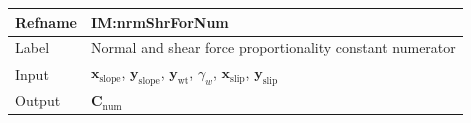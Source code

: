 \documentclass[12pt]{article}
\begin{document}
\medskip
\noindent
\begin{minipage}{\textwidth}
\begin{tabular}{>{\raggedright}p{}>{\raggedright\arraybackslash}p{}}
\toprule \textbf{Refname} & \textbf{IM:nrmShrForNum}
\label{IM:nrmShrForNum}
\\ \midrule
Label & Normal and shear force proportionality constant numerator
        
\\ \midrule
Input & ${\symbf{x}_{\text{slope}}}$, ${\symbf{y}_{\text{slope}}}$, ${\symbf{y}_{\text{wt}}}$, ${γ_{w}}$, ${\symbf{x}_{\text{slip}}}$, ${\symbf{y}_{\text{slip}}}$
        
\\ \midrule
Output & ${\symbf{C}_{\text{num}}}$
         

\end{tabular}
\end{minipage}
\end{document}

